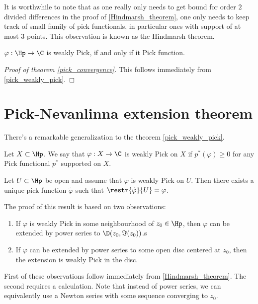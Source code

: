 It is worthwhile to note that as one really only needs to get bound for order $2$ divided differences in the proof of \ref{Hindmarsh_theorem}, one only needs to keep track of small family of pick functionals, in particular ones with support of at most $3$ points. This observation is known as the Hindmarsh theorem.

\begin{kor}\label{pick_weakly_pick}
	$\varphi : \Hp \to \C$ is weakly Pick, if and only if it Pick function.
\end{kor}

\begin{proof}[Proof of theorem \ref{pick_convergence}]
	This follows immediately from \ref{pick_weakly_pick}.
\end{proof}

\section{Pick-Nevanlinna extension theorem}

There's a remarkable generalization to the theorem \ref{pick_weakly_pick}.

\begin{maar}
	Let $X \subset \Hp$. We say that $\varphi : X \to \C$ is weakly Pick on $X$ if $p^{*}(\varphi) \geq 0$ for any Pick functional $p^{*}$ supported on $X$.
\end{maar}

\begin{lause}\label{open_pick_interpolation}
	Let $U \subset \Hp$ be open and assume that $\varphi$ is weakly Pick on $U$. Then there exists a unique pick function $\tilde{\varphi}$ such that $\restr{\tilde{\varphi}}{U} = \varphi$.
\end{lause}

The proof of this result is based on two observations:

\begin{enumerate}
	\item If $\varphi$ is weakly Pick in some neighbourhood of $z_{0} \in \Hp$, then $\varphi$ can be extended by power series to $\D(z_{0}, \Im(z_{0}))$.s
	\item If $\varphi$ can be extended by power series to some open disc centered at $z_{0}$, then the extension is weakly Pick in the disc.
\end{enumerate}

First of these observations follow immediately from \ref{Hindmarsh_theorem}. The second requires a calculation. Note that instead of power series, we can equivalently use a Newton series with some sequence converging to $z_{0}$.


